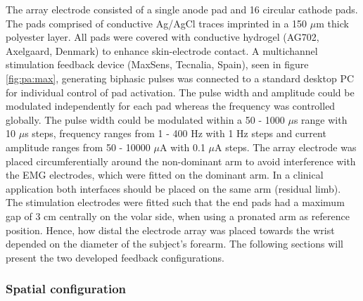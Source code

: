 The array electrode consisted of a single anode pad and 16 circular cathode pads. The pads comprised of conductive Ag/AgCl traces imprinted in a 150 $\mu$m thick polyester layer. All pads were covered with conductive hydrogel (AG702, Axelgaard, Denmark) to enhance skin-electrode contact.  A multichannel stimulation feedback device (MaxSens, Tecnalia, Spain), seen in figure \ref{fig:pa:max}, generating biphasic pulses was connected to a standard desktop PC for individual control of pad activation. The pulse width and amplitude could be modulated independently for each pad whereas the frequency was controlled globally. The pulse width could be modulated within a 50 - 1000 $\mu $s range with 10 $\mu $s steps, frequency ranges from 1 - 400 Hz with 1 Hz steps and current amplitude ranges from 50 - 10000 $\mu $A with 0.1 $\mu $A steps. The array electrode was placed circumferentially around the non-dominant arm to avoid interference with the EMG electrodes, which were fitted on the dominant arm. In a clinical application both interfaces should be placed on the same arm (residual limb). The stimulation electrodes were fitted such that the end pads had a maximum gap of 3 cm centrally on the volar side, when using a pronated arm as reference position. Hence, how distal the electrode array was placed towards the wrist depended on the diameter of the subject's forearm. The following sections will present the two developed feedback configurations. 


\subsubsection{Spatial configuration}

